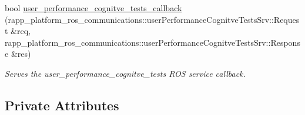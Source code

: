 \begin{DoxyCompactItemize}
bool \hyperlink{classKnowrobWrapperCommunications_a956d4705d0234c0ed13179aff5897b30}{user\-\_\-performance\-\_\-cognitve\-\_\-tests\-\_\-callback} (rapp\-\_\-platform\-\_\-ros\-\_\-communications\-::user\-Performance\-Cognitve\-Tests\-Srv\-::\-Request \&req, rapp\-\_\-platform\-\_\-ros\-\_\-communications\-::user\-Performance\-Cognitve\-Tests\-Srv\-::\-Response \&res)
\begin{DoxyCompactList}\small\item\em Serves the user\-\_\-performance\-\_\-cognitve\-\_\-tests R\-O\-S service callback. \end{DoxyCompactList}\end{DoxyCompactItemize}
\subsection*{Private Attributes}
